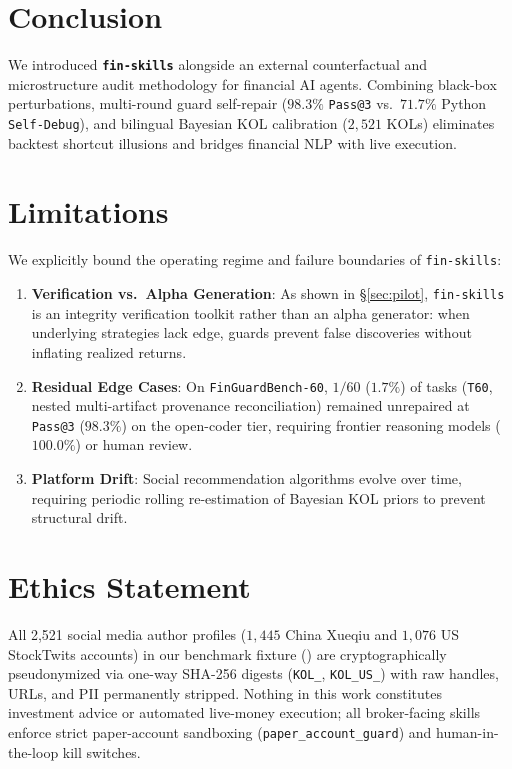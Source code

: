 \section{Conclusion}
\label{sec:conclusion}
\vspace{-0.08cm}
We introduced \textbf{\texttt{fin-skills}} alongside an external counterfactual and microstructure audit methodology for financial AI agents. Combining black-box perturbations, multi-round guard self-repair ($98.3\%$ \texttt{Pass@3} vs.\ $71.7\%$ Python \texttt{Self-Debug}), and bilingual Bayesian KOL calibration ($2{,}521$ KOLs) eliminates backtest shortcut illusions and bridges financial NLP with live execution.

\clearpage

\section*{Limitations}
\label{sec:limitations}

We explicitly bound the operating regime and failure boundaries of \texttt{fin-skills}:
\begin{enumerate}
    \item \textbf{Verification vs.\ Alpha Generation}: As shown in \S\ref{sec:pilot}, \texttt{fin-skills} is an integrity verification toolkit rather than an alpha generator: when underlying strategies lack edge, guards prevent false discoveries without inflating realized returns.
    \item \textbf{Residual Edge Cases}: On \texttt{FinGuardBench-60}, $1/60$ ($1.7\%$) of tasks (\texttt{T60}, nested multi-artifact provenance reconciliation) remained unrepaired at \texttt{Pass@3} ($98.3\%$) on the open-coder tier, requiring frontier reasoning models ($100.0\%$) or human review.
    \item \textbf{Platform Drift}: Social recommendation algorithms evolve over time, requiring periodic rolling re-estimation of Bayesian KOL priors to prevent structural drift.
\end{enumerate}

\section*{Ethics Statement}
All 2,521 social media author profiles ($1{,}445$ China Xueqiu and $1{,}076$ US StockTwits accounts) in our benchmark fixture () are cryptographically pseudonymized via one-way SHA-256 digests (\texttt{KOL\_<10-hex>}, \texttt{KOL\_US\_<10-hex>}) with raw handles, URLs, and PII permanently stripped. Nothing in this work constitutes investment advice or automated live-money execution; all broker-facing skills enforce strict paper-account sandboxing (\texttt{paper\_account\_guard}) and human-in-the-loop kill switches.
